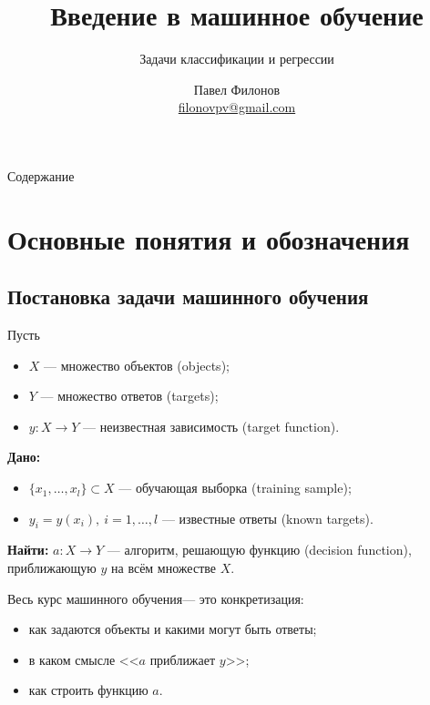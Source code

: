 \documentclass[compress]{beamer}
\author{Павел Филонов \\ \href{mailto:filonovpv@gmail.com}{filonovpv@gmail.com}}
\title{Введение в машинное обучение}
\subtitle{Задачи классификации и регрессии}
\begin{document}
\begin{frame}
    \titlepage
\end{frame}
\begin{frame}{Содержание}
  \tableofcontents
\end{frame}
\section{Основные понятия и обозначения}
\subsection{Постановка задачи машинного обучения}
\begin{frame}
Пусть
    \begin{itemize}
        \item $X$ --- множество объектов (objects);
        \item $Y$ --- множество ответов (targets);
        \item $y: X \rightarrow Y$ --- неизвестная зависимость (target function).
    \end{itemize}
    {\bf Дано:}
    \begin{itemize}
        \item $\{x_1, \dots, x_l\} \subset X$ --- обучающая выборка (training sample);
        \item $y_i = y(x_i),~ i=1,\dots, l$ --- известные ответы (known targets).
    \end{itemize}
    {\bf Найти:}
    $a: X \rightarrow Y$ --- алгоритм, решающую функцию (decision function), приближающую $y$ на всём множестве $X$.


Весь курс машинного обучения--- это конкретизация:
    \begin{itemize}
        \item как задаются объекты и какими могут быть ответы;
        \item в каком смысле <<$a$ приближает $y$>>;
        \item как строить функцию $a$.
    \end{itemize}

\end{frame}
\end{document}
